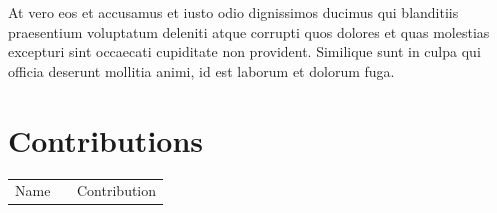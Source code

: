 \documentclass[conference]{IEEEtran}
\begin{document}
At vero eos et accusamus et iusto odio dignissimos ducimus qui blanditiis praesentium voluptatum deleniti atque corrupti quos dolores et quas molestias excepturi sint occaecati cupiditate non provident. Similique sunt in culpa qui officia deserunt mollitia animi, id est laborum et dolorum fuga.



\vspace{12pt}

\newpage
\section*{Contributions}
\begin{tabular}{l|p{0.6\linewidth}}
Name & Contribution\\
\end{tabular}
\end{document}
